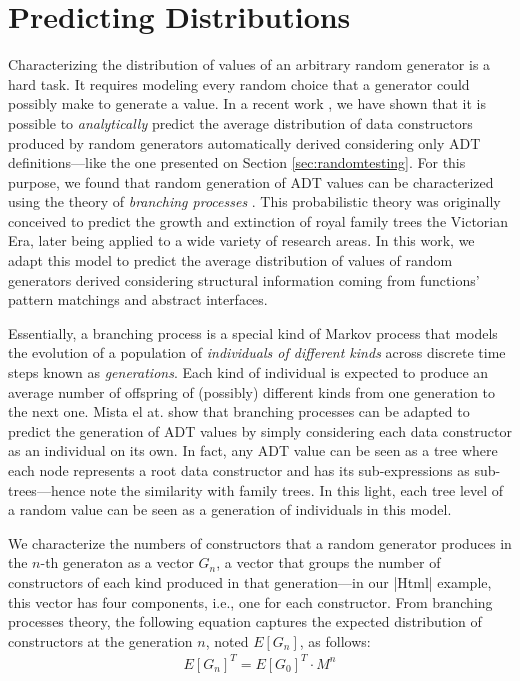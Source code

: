 \section{Predicting Distributions} \label{sec:synthesis}

Characterizing the distribution of values of an arbitrary random generator is a
hard task.
%
It requires modeling every random choice that a generator could possibly make to
generate a value.
%
In a recent work \cite{DBLP:conf/haskell/MistaRH18}, we have shown that it is
possible to \emph{analytically} predict the average distribution of data
constructors produced by random generators automatically derived considering
only ADT definitions---like the one presented on Section
\ref{sec:randomtesting}.
%
For this purpose, we found that random generation of ADT values can be
characterized using the theory of \emph{branching processes} \cite{gw1875}.
%
This probabilistic theory was originally conceived to predict the growth and
extinction of royal family trees the Victorian Era, later being applied to a
wide variety of research areas.
%
In this work, we adapt this model to predict the average distribution of values
of random generators derived considering structural information coming from
functions' pattern matchings and abstract interfaces.

Essentially, a branching process is a special kind of Markov process that models
the evolution of a population of \emph{individuals of different kinds} across
discrete time steps known as \emph{generations}.
%
Each kind of individual is expected to produce an average number of offspring of
(possibly) different kinds from one generation to the next one.
%
Mista el at. \cite{DBLP:conf/haskell/MistaRH18} show that branching processes
can be adapted to predict the generation of ADT values by simply considering
each data constructor as an individual on its own.
%
In fact, any ADT value can be seen as a tree where each node represents a root
data constructor and has its sub-expressions as sub-trees---hence note the
similarity with family trees.
%
In this light, each tree level of a random value can be seen as a generation of
individuals in this model.


We characterize the numbers of constructors that a random generator produces in
the $n$-th generaton as a vector $G_n$, a vector that groups the number of
constructors of each kind produced in that generation---in our |Html| example,
this vector has four components, i.e., one for each constructor.
%
%
From branching processes theory, the following equation captures the expected
distribution of constructors at the generation $n$, noted $E[G_n]$, as follows:
%
\begin{align}
  E[G_n]^T = E[G_0]^T \cdot M^n
  \label{eqn:prediction}
\end{align}

